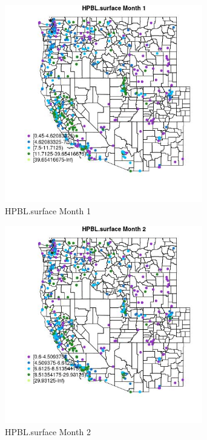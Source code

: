 \begin{figure} 
\centering  
\includegraphics[width=0.77\textwidth]{Code_Outputs/ML_input_report_ML_input_PM25_Step5_part_d_de_duplicated_aves_ML_input_MapObsMo1HPBLsurface.jpg} 
\caption{\label{fig:ML_input_report_ML_input_PM25_Step5_part_d_de_duplicated_aves_ML_inputMapObsMo1HPBLsurface}HPBL.surface Month 1} 
\end{figure} 
 

\begin{figure} 
\centering  
\includegraphics[width=0.77\textwidth]{Code_Outputs/ML_input_report_ML_input_PM25_Step5_part_d_de_duplicated_aves_ML_input_MapObsMo2HPBLsurface.jpg} 
\caption{\label{fig:ML_input_report_ML_input_PM25_Step5_part_d_de_duplicated_aves_ML_inputMapObsMo2HPBLsurface}HPBL.surface Month 2} 
\end{figure} 
 

